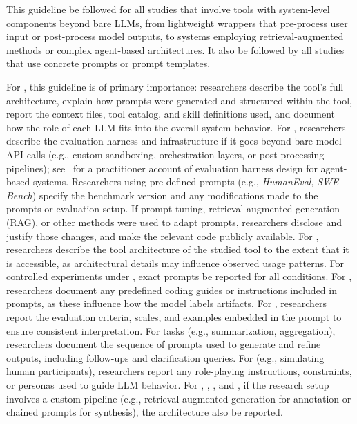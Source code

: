 
This guideline \must be followed for all studies that involve tools with system-level components beyond bare LLMs, from lightweight wrappers that pre-process user input or post-process model outputs, to systems employing retrieval-augmented methods or complex agent-based architectures.
It also \must be followed by all studies that use concrete prompts or prompt templates.

For \newtools, this guideline is of primary importance: researchers \must describe the tool's full architecture, explain how prompts were generated and structured within the tool, report the context files, tool catalog, and skill definitions used, and document how the role of each LLM fits into the overall system behavior.
For \benchmarkingtasks, researchers \should describe the evaluation harness and infrastructure if it goes beyond bare model API calls (e.g., custom sandboxing, orchestration layers, or post-processing pipelines); see~\cite{Anthropic2025evals} for a practitioner account of evaluation harness design for agent-based systems.
Researchers using pre-defined prompts (e.g., \emph{HumanEval}, \emph{SWE-Bench}) \must specify the benchmark version and any modifications made to the prompts or evaluation setup.
If prompt tuning, retrieval-augmented generation (RAG), or other methods were used to adapt prompts, researchers \must disclose and justify those changes, and \should make the relevant code publicly available.
For \llmusage, researchers \should describe the tool architecture of the studied tool to the extent that it is accessible, as architectural details may influence observed usage patterns.
For controlled experiments under \llmusage, exact prompts \must be reported for all conditions.
For \annotators, researchers \must document any predefined coding guides or instructions included in prompts, as these influence how the model labels artifacts.
For \judges, researchers \must report the evaluation criteria, scales, and examples embedded in the prompt to ensure consistent interpretation.
For \synthesis tasks (e.g., summarization, aggregation), researchers \must document the sequence of prompts used to generate and refine outputs, including follow-ups and clarification queries.
For \subjects (e.g., simulating human participants), researchers \must report any role-playing instructions, constraints, or personas used to guide LLM behavior.
For \annotators, \judges, \synthesis, and \subjects, if the research setup involves a custom pipeline (e.g., retrieval-augmented generation for annotation or chained prompts for synthesis), the architecture \should also be reported.

